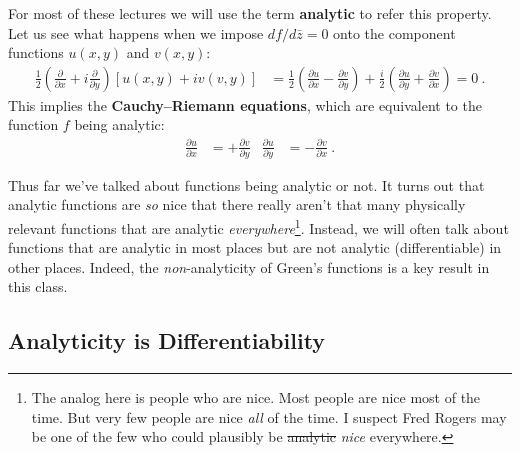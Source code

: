 For most of these lectures we will use the term \textbf{analytic} to refer this property. Let us see what happens when we impose $df/d\bar{z} = 0$ onto the component functions $u(x,y)$ and $v(x,y)$:
\begin{align}
	\frac{1}{2}\left(\frac{\partial}{\partial x} + i \frac{\partial}{\partial y}\right)
	\left[u(x,y)+iv(v,y)\right]
	&= 
	\frac{1}{2}
	\left( \frac{\partial u}{\partial x} - \frac{\partial v}{\partial y} \right)
	+
	\frac{i}{2}
	\left( \frac{\partial u}{\partial y} + \frac{\partial v}{\partial x} \right)
	= 0 \ .
\end{align}
This implies the \textbf{Cauchy--Riemann equations}, which are equivalent to the function $f$ being analytic:
\begin{align}
	\frac{\partial u}{\partial x} & = +\frac{\partial v}{\partial y}
	&
	\frac{\partial u}{\partial y} & = -\frac{\partial v}{\partial x} \ .
\end{align}

Thus far we've talked about functions being analytic or not. It turns out that analytic functions are \emph{so} nice that there really aren't that many physically relevant functions that are analytic \emph{everywhere}\footnote{The analog here is people who are nice. Most people are nice most of the time. But very few people are nice \emph{all} of the time. I suspect Fred Rogers may be one of the few who could plausibly be \sout{analytic} \emph{nice} everywhere.}. Instead, we will often talk about functions that are analytic in most places but are not analytic (differentiable) in other places. Indeed, the \emph{non}-analyticity of Green's functions is a key result in this class.

\subsection{Analyticity is Differentiability}

